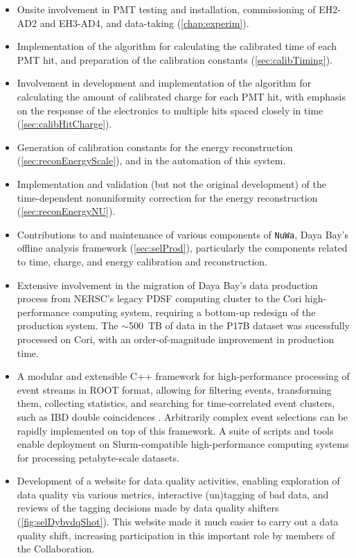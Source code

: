 \documentclass[../thesis.tex]{subfiles}
\begin{document}
\begin{itemize}
  \item Onsite involvement in PMT testing and installation, commissioning of EH2-AD2 and EH3-AD4, and data-taking (\autoref{chap:experim}).
  \item Implementation of the algorithm for calculating the calibrated time of each PMT hit, and preparation of the calibration constants (\autoref{sec:calibTiming}).
  \item Involvement in development and implementation of the algorithm for calculating the amount of calibrated charge for each PMT hit, with emphasis on the response of the electronics to multiple hits spaced closely in time (\autoref{sec:calibHitCharge}).
  \item Generation of calibration constants for the energy reconstruction (\autoref{sec:reconEnergyScale}), and in the automation of this system.
  \item Implementation and validation (but not the original development) of the time-dependent nonuniformity correction for the energy reconstruction (\autoref{sec:reconEnergyNU}).
  \item Contributions to and maintenance of various components of \texttt{NuWa}, Daya Bay's offline analysis framework (\autoref{sec:selProd}), particularly the components related to time, charge, and energy calibration and reconstruction.
  \item Extensive involvement in the migration of Daya Bay's data production process from NERSC's legacy PDSF computing cluster to the Cori high-performance computing system, requiring a bottom-up redesign of the production system. The $\sim$500~TB of data in the P17B dataset was sucessfully processed on Cori, with an order-of-magnitude improvement in production time.
  \item A modular and extensible C++ framework for high-performance processing of event streams in ROOT format, allowing for filtering events, transforming them, collecting statistics, and searching for time-correlated event clusters, such as IBD double coincidences \cite{SelectorFramework}. Arbitrarily complex event selections can be rapidly implemented on top of this framework. A suite of scripts and tools enable deployment on Slurm-compatible high-performance computing systems for processing petabyte-scale datasets.
  \item Development of a website \cite{dybvdq} for data quality activities, enabling exploration of data quality via various metrics, interactive (un)tagging of bad data, and reviews of the tagging decisions made by data quality shifters (\autoref{fig:selDybvdqShot}). This website made it much easier to carry out a data quality shift, increasing participation in this important role by members of the Collaboration.

\end{itemize}
\end{document}
